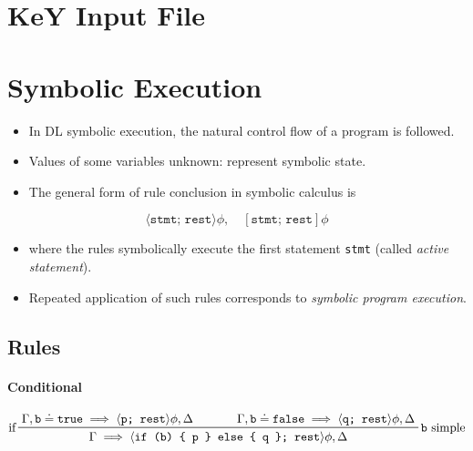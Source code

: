 
\section{KeY Input File} %

\section{Symbolic Execution} %
\begin{itemize}
	\item In DL symbolic execution, the natural control flow of a program is followed.
	\item Values of some variables unknown: represent symbolic state.
	\item The general form of rule conclusion in symbolic calculus is
\end{itemize}
\begin{equation*}
	\langle \texttt{stmt; rest} \rangle \phi, \quad [\texttt{stmt; rest}] \phi
\end{equation*}
\begin{itemize}
	\item[] where the rules symbolically execute the first statement \texttt{stmt} (called \textit{active statement}).
	\item Repeated application of such rules corresponds to \textit{symbolic program execution}.
\end{itemize}

\subsection{Rules} %
\paragraph{Conditional} %
\begin{equation*}
	\prftree[l, r]
	{\texttt{b} simple}
	{if}
	{\Gamma, \texttt{b} \doteq \texttt{true} \implies \langle \texttt{p; rest} \rangle \phi, \Delta}
	{\qquad}
	{\Gamma, \texttt{b} \doteq \texttt{false} \implies \langle \texttt{q; rest} \rangle \phi, \Delta}
	{\Gamma \implies \langle \texttt{if (b) \{ p \} else \{ q \}; rest} \rangle \phi, \Delta}
\end{equation*}

